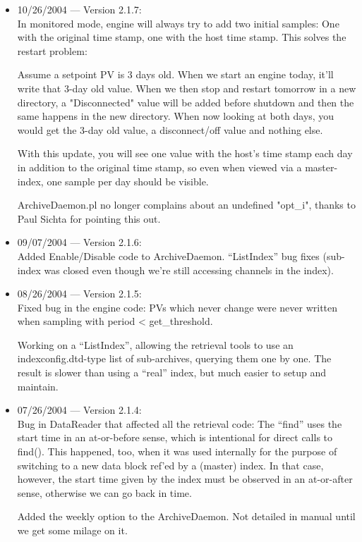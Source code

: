 \begin{itemize}
\item 10/26/2004 --- Version 2.1.7:\\
In monitored mode, engine will always try to add two initial
samples: One with the original time stamp, one with the host
time stamp. This solves the restart problem:

Assume a setpoint PV is 3 days old. When we start an engine today,
it'll write that 3-day old value. When we then stop and restart tomorrow
in a new directory, a "Disconnected" value will be added before shutdown
and then the same happens in the new directory.
When now looking at both days, you would get the 3-day old value,
a disconnect/off value and nothing else.

With this update, you will see one value with the host's time stamp
each day in addition to the original time stamp, so even when viewed
via a master-index, one sample per day should be visible.

ArchiveDaemon.pl no longer complains about an undefined "opt\_i",
thanks to Paul Sichta for pointing this out.

\item 09/07/2004 --- Version 2.1.6:\\
Added Enable/Disable code to ArchiveDaemon.
``ListIndex'' bug fixes (sub-index was
closed even though we're still accessing channels in the index).

\item 08/26/2004 --- Version 2.1.5:\\
Fixed bug in the engine code: PVs which never change
were never written when sampling with period < get\_threshold.

Working on a ``ListIndex'', allowing the retrieval
tools to use an indexconfig.dtd-type list of
sub-archives, querying them one by one.
The result is slower than using a ``real'' index,
but much easier to setup and maintain.

\item 07/26/2004 --- Version 2.1.4:\\
Bug in DataReader that affected all the retrieval code:
The ``find'' uses the start time in an at-or-before sense,
which is intentional for direct calls to find().
This happened, too, when it was used internally for the purpose
of switching to a new data block ref'ed by a (master) index.
In that case, however, the start time given by the index must
be observed in an at-or-after sense, otherwise we can go
back in time.

Added the weekly option to the ArchiveDaemon.
Not detailed in manual until we get some milage on it.


\end{itemize}
